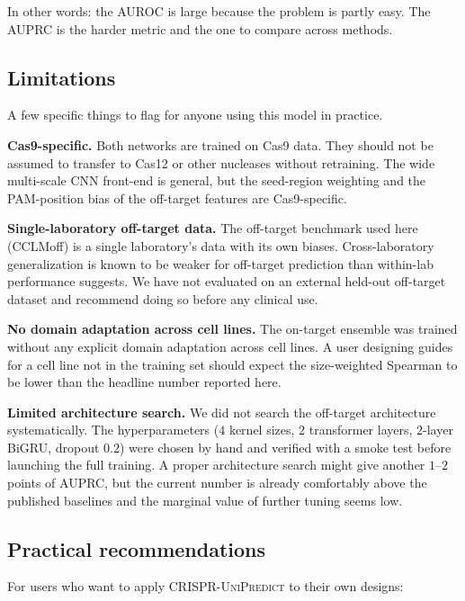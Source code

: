 \documentclass[11pt,a4paper]{article}
\begin{document}
In other words: the AUROC is large because the problem is partly easy. The AUPRC is the harder metric and the one to compare across methods.

\subsection{Limitations}

A few specific things to flag for anyone using this model in practice.

\textbf{Cas9-specific.} Both networks are trained on Cas9 data. They should not be assumed to transfer to Cas12 or other nucleases without retraining. The wide multi-scale CNN front-end is general, but the seed-region weighting and the PAM-position bias of the off-target features are Cas9-specific.

\textbf{Single-laboratory off-target data.} The off-target benchmark used here (CCLMoff) is a single laboratory's data with its own biases. Cross-laboratory generalization is known to be weaker for off-target prediction than within-lab performance suggests. We have not evaluated on an external held-out off-target dataset and recommend doing so before any clinical use.

\textbf{No domain adaptation across cell lines.} The on-target ensemble was trained without any explicit domain adaptation across cell lines. A user designing guides for a cell line not in the training set should expect the size-weighted Spearman to be lower than the headline number reported here.

\textbf{Limited architecture search.} We did not search the off-target architecture systematically. The hyperparameters ($4$ kernel sizes, $2$ transformer layers, $2$-layer BiGRU, dropout $0.2$) were chosen by hand and verified with a smoke test before launching the full training. A proper architecture search might give another $1$--$2$ points of AUPRC, but the current number is already comfortably above the published baselines and the marginal value of further tuning seems low.

\subsection{Practical recommendations}

For users who want to apply \textsc{CRISPR-UniPredict} to their own designs:
\end{document}
